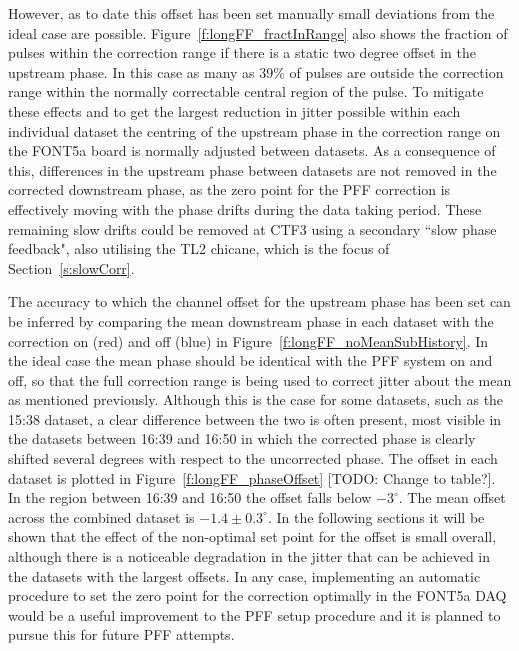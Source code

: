 However, as to date this offset has been set manually small deviations from the ideal case are possible. Figure~\ref{f:longFF_fractInRange} also shows the fraction of pulses within the correction range if there is a static two degree offset in the upstream phase. In this case as many as 39\% of pulses are outside the correction range within the normally correctable central region of the pulse. To mitigate these effects and to get the largest reduction in jitter possible within each individual dataset the centring of the upstream phase in the correction range on the FONT5a board is normally adjusted between datasets. As a consequence of this, differences in the upstream phase between datasets are not removed in the corrected downstream phase, as the zero point for the PFF correction is effectively moving with the phase drifts during the data taking period. These remaining slow drifts could be removed at CTF3 using a secondary ``slow phase feedback", also utilising the TL2 chicane, which is the focus of Section~\ref{s:slowCorr}.

The accuracy to which the channel offset for the upstream phase has been set can be inferred by comparing the mean downstream phase in each dataset with the correction on (red) and off (blue) in Figure~\ref{f:longFF_noMeanSubHistory}. In the ideal case the mean phase should be identical with the PFF system on and off, so that the full correction range is being used to correct jitter about the mean as mentioned previously. Although this is the case for some datasets, such as the 15:38 dataset, a clear difference between the two is often present, most visible in the datasets between 16:39 and 16:50 in which the corrected phase is clearly shifted several degrees with respect to the uncorrected phase. The offset in each dataset is plotted in Figure~\ref{f:longFF_phaseOffset} [TODO: Change to table?]. In the region between 16:39 and 16:50 the offset falls below \(-3^\circ\). The mean offset across the combined dataset is \(-1.4\pm0.3^\circ\). In the following sections it will be shown that the effect of the non-optimal set point for the offset is small overall, although there is a noticeable degradation in the jitter that can be achieved in the datasets with the largest offsets. In any case, implementing an automatic procedure to set the zero point for the correction optimally in the FONT5a DAQ would be a useful improvement to the PFF setup procedure and it is planned to pursue this for future PFF attempts.

